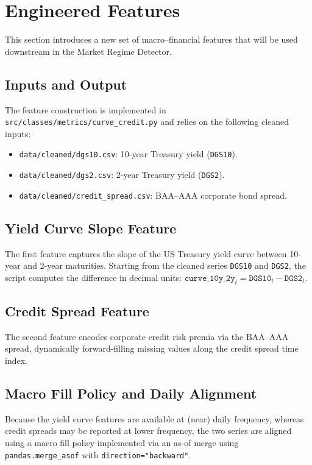 \documentclass[a4paper,fleqn]{cas-dc} %
\begin{document}
\section{Engineered Features}

This section introduces a new set of macro–financial features that will be used downstream in the Market Regime Detector.

\subsection{Inputs and Output}
The feature construction is implemented in \texttt{src/classes/metrics/curve\_credit.py} and relies on the following cleaned inputs:
\begin{itemize}
    \item \texttt{data/cleaned/dgs10.csv}: 10-year Treasury yield (\texttt{DGS10}).
    \item \texttt{data/cleaned/dgs2.csv}: 2-year Treasury yield (\texttt{DGS2}).
    \item \texttt{data/cleaned/credit\_spread.csv}: BAA–AAA corporate bond spread.
\end{itemize}

\subsection{Yield Curve Slope Feature}
The first feature captures the slope of the US Treasury yield curve between 10-year and 2-year maturities. Starting from the cleaned series \texttt{DGS10} and \texttt{DGS2}, the script computes the difference in decimal units:
$ \texttt{curve\_10y\_2y}_t = \texttt{DGS10}_t - \texttt{DGS2}_t $.

\subsection{Credit Spread Feature}
The second feature encodes corporate credit risk premia via the BAA–AAA spread, dynamically forward-filling missing values along the credit spread time index.

\subsection{Macro Fill Policy and Daily Alignment}
Because the yield curve features are available at (near) daily frequency, whereas credit spreads may be reported at lower frequency, the two series are aligned using a macro fill policy implemented via an as-of merge using \texttt{pandas.merge\_asof} with \texttt{direction="backward"}.
\end{document}
